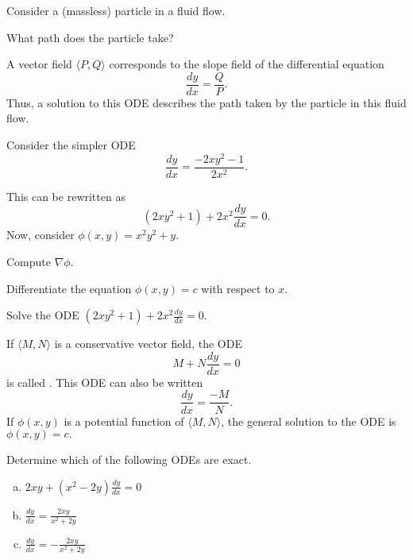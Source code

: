 \begin{applicationActivities}

\begin{observation}
Consider a (massless) particle in a fluid flow.


What path does the particle take?
\end{observation}

\begin{observation}
A vector field \(\langle P,Q\rangle\) corresponds to the slope field of the differential equation \[\frac{dy}{dx}=\frac{Q}{P}.\]
\vfill
Thus, a solution to this ODE describes the path taken by the particle in this fluid flow.
\end{observation}

\begin{activity}{10}
Consider the simpler ODE \[\frac{dy}{dx} = \frac{-2xy^2-1}{2x^2}.\]

This can be rewritten as \[ (2xy^2+1) + 2x^2 \frac{dy}{dx} = 0 .\]
\vfill
Now, consider \(\phi(x,y)=x^2y^2+y \).  
\begin{subactivity}
Compute \(\nabla \phi \).
\end{subactivity}
\begin{subactivity}
Differentiate the equation \(\phi(x,y)=c\) with respect to \(x\).
\end{subactivity}
\begin{subactivity}
Solve the ODE \( (2xy^2+1) + 2x^2 \frac{dy}{dx} = 0 \).
\end{subactivity}
\end{activity}

\begin{definition}
If \(\langle M,N\rangle\) is a conservative vector field, the ODE
\[M + N \frac{dy}{dx} = 0 \]
is called .  This ODE can also be written
\[\frac{dy}{dx} = \frac{ -M}{N} .\]
If \(\phi(x,y)\) is a potential function of \(\langle M,N\rangle\), the general solution to the
ODE is \(\phi(x,y)=c.\)
\end{definition}

\begin{activity}{10}
Determine which of the following ODEs are exact.
\begin{enumerate}[(a)]
\item \(2xy+(x^2-2y)\frac{dy}{dx}=0\) 
\item \(\frac{dy}{dx} = \frac{2xy}{x^2+2y} \)
\item \(\frac{dy}{dx} = -\frac{2xy}{x^2+2y} \)
\end{enumerate}
\end{activity}


\end{applicationActivities}
